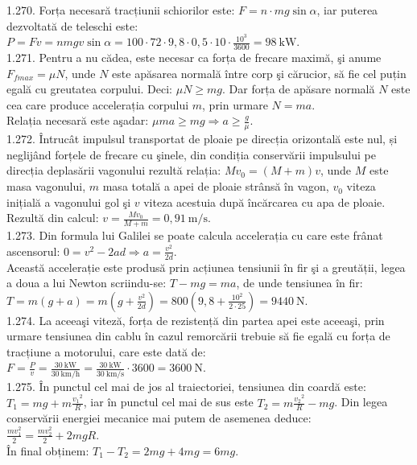 1.270. Forța necesară tracțiunii schiorilor este: $F=n \cdot m g \sin \alpha$, iar puterea dezvoltată de teleschi este:\\ $P=F v=n m g v \sin \alpha=100 \cdot 72 \cdot 9,8 \cdot 0,5 \cdot 10 \cdot \frac{10^{3}}{3600}=98 \mathrm{~kW}$.\\

1.271. Pentru a nu cădea, este necesar ca forța de frecare maximă, şi anume $F_{f max}=\mu N$, unde $N$ este apăsarea normală între corp şi cărucior, să fie cel puțin egală cu greutatea corpului. Deci: $\mu N \geq m g$. Dar forța de apăsare normală $N$ este cea care produce accelerația corpului $m$, prin urmare $N=m a$.\\ Relația necesară este aşadar: $\mu m a \geq m g \Rightarrow a \geq \frac{g}{\mu}$.\\

1.272. Întrucât impulsul transportat de ploaie pe direcția orizontală este nul, și neglijând forțele de frecare cu şinele, din condiția conservării impulsului pe direcția deplasării vagonului rezultă relația: $M v_{0}=(M+m) v$, unde $M$ este masa vagonului, $m$ masa totală a apei de ploaie strânsă în vagon, $v_{0}$ viteza inițială a vagonului gol şi $v$ viteza acestuia după încărcarea cu apa de ploaie.\\ Rezultă din calcul: $v=\frac{M v_{0}}{M+m}=0,91 \mathrm{~m} / \mathrm{s}$.\\

1.273. Din formula lui Galilei se poate calcula accelerația cu care este frânat ascensorul: $0=v^{2}-2 a d \Rightarrow a=\frac{v^{2}}{2 d}$.\\ Această accelerație este produsă prin acțiunea tensiunii în fir şi a greutății, legea a doua a lui Newton scriindu-se: $T-m g=m a$, de unde tensiunea în fir:\\ $T=m(g+a)=m\left(g+\frac{v^{2}}{2 d}\right)=800\left(9,8+\frac{10^{2}}{2 \cdot 25}\right)=9440 \mathrm{~N}$.\\

1.274. La aceeaşi viteză, forța de rezistență din partea apei este aceeaşi, prin urmare tensiunea din cablu în cazul remorcării trebuie să fie egală cu forța de tracțiune a motorului, care este dată de:\\ $F=\frac{P}{v}=\frac{30 \mathrm{~kW}}{30 \mathrm{~km} / \mathrm{h}}=\frac{30 \mathrm{~kW}}{30 \mathrm{~km} / \mathrm{s}} \cdot 3600=3600 \mathrm{~N}$.\\

1.275. În punctul cel mai de jos al traiectoriei, tensiunea din coardă este:\\ $T_{1}=m g+m \frac{v_{1}{ }^{2}}{R}$, iar în punctul cel mai de sus este $T_{2}=m \frac{v_{2}{ }^{2}}{R}-m g$. Din legea conservării energiei mecanice mai putem de asemenea deduce:\\ $\frac{m v_{1}^{2}}{2}=\frac{m v_{2}^{2}}{2}+2 m g R$.\\ În final obținem: $T_{1}-T_{2}=2 m g+4 m g=6 m g$.\\

